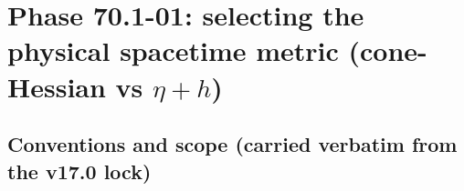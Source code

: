
\section{Phase 70.1-01: selecting the physical spacetime metric (cone-Hessian vs $\eta+h$)}

\subsection{Conventions and scope (carried verbatim from the v17.0 lock)}

